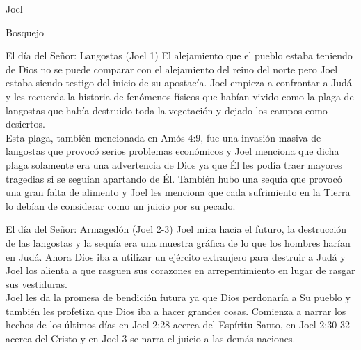 \documentclass[12pt]{article}
\begin{document}
\begin{section}{Joel}
\begin{subsection}{Bosquejo}
\begin{subsubsection}{El día del Señor: Langostas (Joel 1)}
El alejamiento que el pueblo estaba teniendo de Dios no se puede comparar con el alejamiento del reino del norte pero Joel estaba siendo testigo del inicio de su apostacía. Joel empieza a confrontar a Judá y les recuerda la historia de fenómenos físicos que habían vivido como la plaga de langostas que había destruido toda la vegetación y dejado los campos como desiertos.\\
Esta plaga, también mencionada en Amós 4:9, fue una invasión masiva de langostas que provocó serios problemas económicos y Joel menciona que dicha plaga solamente era una advertencia de Dios ya que Él les podía traer mayores tragedias si se seguían apartando de Él. También hubo una sequía que provocó una gran falta de alimento y Joel les menciona que cada sufrimiento en la Tierra lo debían de considerar como un juicio por su pecado.
		\end{subsubsection}
		\begin{subsubsection}{El día del Señor: Armagedón (Joel 2-3)}
			Joel mira hacia el futuro, la destrucción de las langostas y la sequía era una muestra gráfica de lo que los hombres harían en Judá. Ahora Dios iba a utilizar un ejército extranjero para destruir a Judá y Joel los alienta a que rasguen sus corazones en arrepentimiento en lugar de rasgar sus vestiduras. \\
			Joel les da la promesa de bendición futura ya que Dios perdonaría a Su pueblo y también les profetiza que Dios iba a hacer grandes cosas. Comienza a narrar los hechos de los últimos días en Joel 2:28 acerca del Espíritu Santo, en Joel 2:30-32 acerca del Cristo y en Joel 3 se narra el juicio a las demás naciones.\\
		\end{subsubsection}
	\end{subsection}
\end{section}
\end{document}
